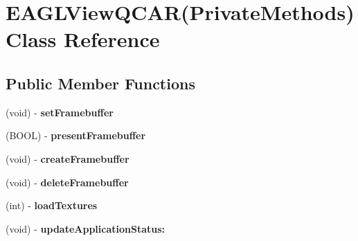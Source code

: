 \hypertarget{interface_e_a_g_l_view_q_c_a_r_07_private_methods_08}{
\section{\-E\-A\-G\-L\-View\-Q\-C\-A\-R(\-Private\-Methods) \-Class \-Reference}
\label{interface_e_a_g_l_view_q_c_a_r_07_private_methods_08}
}
\subsection*{\-Public \-Member \-Functions}
\begin{DoxyCompactItemize}
\item 
\hypertarget{interface_e_a_g_l_view_q_c_a_r_07_private_methods_08_aa63a777dc959afd95d89c3d7ffc340e2}{
(void) -\/ {\bfseries set\-Framebuffer}}
\label{interface_e_a_g_l_view_q_c_a_r_07_private_methods_08_aa63a777dc959afd95d89c3d7ffc340e2}

\item 
\hypertarget{interface_e_a_g_l_view_q_c_a_r_07_private_methods_08_a1c362dcda766264a486cb2d6d16929af}{
(\-B\-O\-O\-L) -\/ {\bfseries present\-Framebuffer}}
\label{interface_e_a_g_l_view_q_c_a_r_07_private_methods_08_a1c362dcda766264a486cb2d6d16929af}

\item 
\hypertarget{interface_e_a_g_l_view_q_c_a_r_07_private_methods_08_a33a891271c99f981b828b51f9408c52b}{
(void) -\/ {\bfseries create\-Framebuffer}}
\label{interface_e_a_g_l_view_q_c_a_r_07_private_methods_08_a33a891271c99f981b828b51f9408c52b}

\item 
\hypertarget{interface_e_a_g_l_view_q_c_a_r_07_private_methods_08_abce028110d17e1e4222d8cf273da3cb0}{
(void) -\/ {\bfseries delete\-Framebuffer}}
\label{interface_e_a_g_l_view_q_c_a_r_07_private_methods_08_abce028110d17e1e4222d8cf273da3cb0}

\item 
\hypertarget{interface_e_a_g_l_view_q_c_a_r_07_private_methods_08_ab9852889ba4714488bcd458edc1fc4ab}{
(int) -\/ {\bfseries load\-Textures}}
\label{interface_e_a_g_l_view_q_c_a_r_07_private_methods_08_ab9852889ba4714488bcd458edc1fc4ab}

\item 
\hypertarget{interface_e_a_g_l_view_q_c_a_r_07_private_methods_08_a755648a0bc6d248118baa62a9196157a}{
(void) -\/ {\bfseries update\-Application\-Status\-:}}
\label{interface_e_a_g_l_view_q_c_a_r_07_private_methods_08_a755648a0bc6d248118baa62a9196157a}


\end{DoxyCompactItemize}
